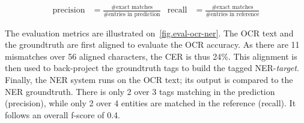 \begin{align}
    \mathrm{precision} &= \frac{\text{\#exact matches}}{\text{\#entries in prediction}} & \mathrm{recall} &= \frac{\text{\#exact matches}}{\text{\#entries in reference}}
    \label{eqn.prec-recall}
\end{align}


The evaluation metrics are illustrated on~\cref{fig.eval-ocr-ner}. The OCR text and the groundtruth are first aligned to
evaluate the OCR accuracy. As there are 11 mismatches over 56 aligned characters, the CER is thus 24\%. This alignment
is then used to back-project the groundtruth tags to build the tagged NER-\emph{target}. Finally, the NER system runs on the
OCR text; its output is compared to the NER groundtruth. There is only 2 over 3 tags matching in the prediction (precision),
while only 2 over 4 entities are matched in the reference (recall). It follows an overall f-score of 0.4.






